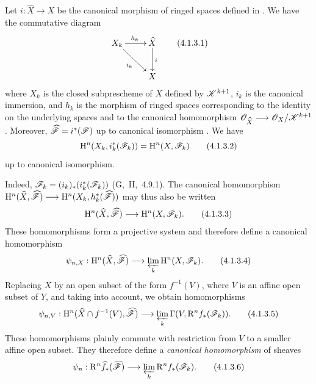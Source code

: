 \begin{env}[4.1.3]
\label{III.4.1.3}
Let $i:\widehat{X}\to X$ be the canonical morphism of ringed spaces
defined in .
We have the commutative diagram
\[
  \xymatrix{
    X_k\ar[r]^{h_k}\ar[dr]_{i_k} &
    \widehat{X}\ar[d]^{i}\\
    & X
  }
  \tag{4.1.3.1}
  \label{III.4.1.3.1}
\]
where $X_k$ is the closed subprescheme of $X$ defined by
$\mathscr{K}^{k+1}$, $i_k$ is the canonical immersion, and $h_k$ is the
morphism of ringed spaces corresponding to the identity on the
underlying spaces and to the canonical homomorphism $\mathscr{O}_{\widehat{X}}
\longrightarrow
\mathscr{O}_X/\mathscr{K}^{k+1}$
.
Moreover, $\widehat{\mathscr{F}}=i^*(\mathscr{F})$
up to canonical isomorphism .
We have
\[
  \mathrm{H}^n(X_k,i_k^*(\mathscr{F}_k))
  =
  \mathrm{H}^n(X,\mathscr{F}_k)
  \tag{4.1.3.2}
  \label{III.4.1.3.2}
\]
up to canonical isomorphism.


Indeed, $\mathscr{F}_k=(i_k)_*(i_k^*(\mathscr{F}_k))$
(G,~II,~4.9.1).
The canonical homomorphism $\mathrm{H}^n(\widehat{X},\widehat{\mathscr{F}})
\longrightarrow
\mathrm{H}^n(X_k,h_k^*(\widehat{\mathscr{F}}))$
 may thus also be written
\[
  \mathrm{H}^n(\widehat{X},\widehat{\mathscr{F}})
  \longrightarrow
  \mathrm{H}^n(X,\mathscr{F}_k).
  \tag{4.1.3.3}
  \label{III.4.1.3.3}
\]
These homomorphisms form a projective system and therefore define a
canonical homomorphism
\[
  \psi_{n,X}:
  \mathrm{H}^n(\widehat{X},\widehat{\mathscr{F}})
  \longrightarrow
  \varprojlim_k\mathrm{H}^n(X,\mathscr{F}_k).
  \tag{4.1.3.4}
  \label{III.4.1.3.4}
\]
Replacing $X$ by an open subset of the form $f^{-1}(V)$, where $V$ is
an affine open subset of $Y$, and taking  into account,
we obtain homomorphisms
\[
  \psi_{n,V}:
  \mathrm{H}^n(\widehat{X}\cap f^{-1}(V),\widehat{\mathscr{F}})
  \longrightarrow
  \varprojlim_k\Gamma(V,\mathrm{R}^n f_*(\mathscr{F}_k)).
  \tag{4.1.3.5}
  \label{III.4.1.3.5}
\]
These homomorphisms plainly commute with restriction from $V$ to a
smaller affine open subset.
They therefore define a \emph{canonical homomorphism} of sheaves
\[
  \psi_n:
  \mathrm{R}^n\widehat{f}_*(\widehat{\mathscr{F}})
  \longrightarrow
  \varprojlim_k\mathrm{R}^n f_*(\mathscr{F}_k).
  \tag{4.1.3.6}
  \label{III.4.1.3.6}
\]
\end{env}

